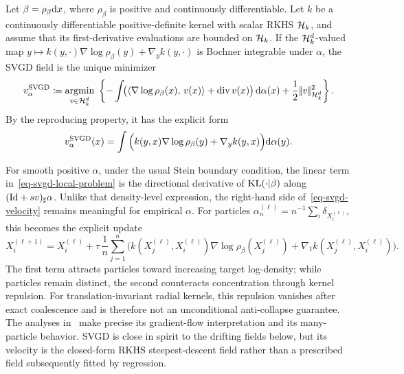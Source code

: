 \begin{defn}\label{def-svgd-vector-field}
Let $\beta=\rho_\beta\mathrm{d} x$, where $\rho_\beta$ is positive and continuously differentiable. Let $k$ be a continuously differentiable positive-definite kernel with scalar RKHS $\mathcal{H}_k$, and assume that its first-derivative evaluations are bounded on $\mathcal{H}_k$. If the $\mathcal{H}_k^d$-valued map $y\mapsto k(y,\cdot)\nabla\log\rho_\beta(y)+\nabla_yk(y,\cdot)$ is Bochner integrable under $\alpha$, the SVGD field is the unique minimizer
\begin{equation}\label{eq-svgd-local-problem}
	v_\alpha^{\mathrm{SVGD}}
	\coloneqq
	\underset{v\in\mathcal{H}_k^d}{\operatorname{argmin}}\;
	\left\{
		-\int\!\bigl(\langle \nabla\log\rho_\beta(x),\,v(x)\rangle+\operatorname{div} v(x)\bigr)\,\mathrm{d}\alpha(x)
		+\frac12|\!| v |\!|_{\mathcal{H}_k^d}^2
	\right\}.
\end{equation}
By the reproducing property, it has the explicit form
\begin{equation}\label{eq-svgd-velocity}
	v_{\alpha}^{\mathrm{SVGD}}(x)
	=
	\int
	\Big(k(y,x)\nabla\log\rho_\beta(y)+\nabla_y k(y,x)\Big)
	\mathrm{d}\alpha(y).
\end{equation}
\end{defn}
For smooth positive $\alpha$, under the usual Stein boundary condition, the linear term in~\eqref{eq-svgd-local-problem} is the directional derivative of $\operatorname{KL}(\cdot|\beta)$ along $(\mathrm{Id}+s v)_\sharp\alpha$. Unlike that density-level expression, the right-hand side of~\eqref{eq-svgd-velocity} remains meaningful for empirical $\alpha$.
For particles $\alpha_n^{(\ell)}=n^{-1}\sum_i\delta_{X_i^{(\ell)}}$, this becomes the explicit update
\begin{equation}\label{eq-svgd-particle-update}
	X_i^{(\ell+1)}
	=
	X_i^{(\ell)}
	+
	\tau\,\frac{1}{n}\sum_{j=1}^n
	\Big(k(X_j^{(\ell)},X_i^{(\ell)})\nabla\log\rho_\beta(X_j^{(\ell)})
	+
		\nabla_1k(X_j^{(\ell)},X_i^{(\ell)})\Big).
\end{equation}
The first term attracts particles toward increasing target log-density; while particles remain distinct, the second counteracts concentration through kernel repulsion. For translation-invariant radial kernels, this repulsion vanishes after exact coalescence and is therefore not an unconditional anti-collapse guarantee. The analyses in~\cite{Liu2017SVGDGradientFlow,DuncanNueskenSzpruch2019SVGDGeometry,NueskenRenger2021SVGDAsymptotics} make precise its gradient-flow interpretation and its many-particle behavior. SVGD is close in spirit to the drifting fields below, but its velocity is the closed-form RKHS steepest-descent field rather than a prescribed field subsequently fitted by regression.

